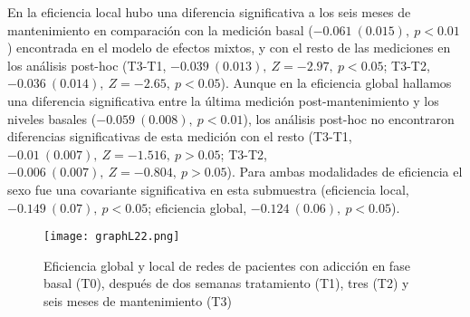 En la eficiencia local hubo una diferencia significativa a los seis meses de mantenimiento en comparación con la medición basal ($-0.061\ (0.015),\ p<0.01$) encontrada en el modelo de efectos mixtos, y con el resto de las mediciones en los análisis post-hoc (T3-T1, $-0.039\ (0.013),\ Z=-2.97,\ p<0.05$; T3-T2, $-0.036\ (0.014),\ Z=-2.65,\ p<0.05$). Aunque en la eficiencia global hallamos una diferencia significativa entre la última medición post-mantenimiento y los niveles basales ($-0.059\ (0.008),\ p<0.01$), los análisis post-hoc no encontraron diferencias significativas de esta medición con el resto (T3-T1, $-0.01\ (0.007),\ Z=-1.516,\ p>0.05$; T3-T2, $-0.006\ (0.007),\ Z=-0.804,\ p>0.05$). Para ambas modalidades de eficiencia el sexo fue una covariante significativa en esta submuestra (eficiencia local, $-0.149\ (0.07),\ p<0.05$; eficiencia global, $-0.124\ (0.06),\ p<0.05$).

\begin{figure}[!htb]
    \centering
    \texttt{[image: graphL22.png]}
    \caption{Eficiencia global y local de redes de pacientes con adicción en fase basal (T0), después de dos semanas tratamiento (T1), tres (T2) y seis meses de mantenimiento (T3)}
    \label{fig:gpL22}
\end{figure}

